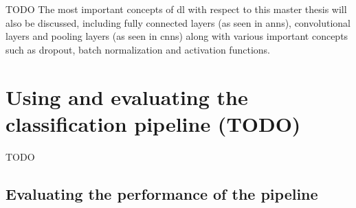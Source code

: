 





TODO
The most important concepts of \gls{dl} with respect to this master thesis will also be discussed, including fully connected layers (as seen in \glspl{ann}), convolutional layers and pooling layers (as seen in \glspl{cnn}) along with various important concepts such as dropout, batch normalization and activation functions.


\section{Using and evaluating the classification pipeline (TODO)}
\label{sec:processing_signals_evaluating_and_using}



TODO


\subsection{Evaluating the performance of the pipeline}
\label{subsec:processing_signals_evaluating_and_using_evaluation}

